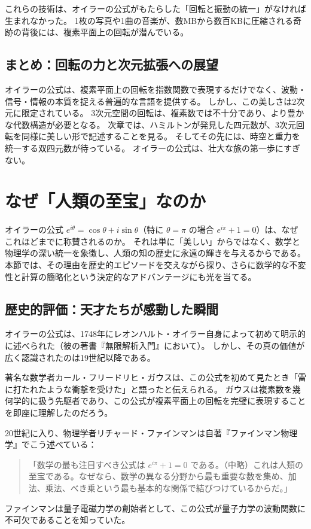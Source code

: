 \documentclass[dvipdfmx,a4paper]{jsbook}
\theoremstyle{definition}
\theoremstyle{remark}
\begin{document}
これらの技術は、オイラーの公式がもたらした「回転と振動の統一」がなければ生まれなかった。
1枚の写真や1曲の音楽が、数MBから数百KBに圧縮される奇跡の背後には、複素平面上の回転が潜んでいる。

\subsection{まとめ：回転の力と次元拡張への展望}

オイラーの公式は、複素平面上の回転を指数関数で表現するだけでなく、波動・信号・情報の本質を捉える普遍的な言語を提供する。
しかし、この美しさは2次元に限定されている。
3次元空間の回転は、複素数では不十分であり、より豊かな代数構造が必要となる。
次章では、ハミルトンが発見した四元数が、3次元回転を同様に美しい形で記述することを見る。
そしてその先には、時空と重力を統一する双四元数が待っている。
オイラーの公式は、壮大な旅の第一歩にすぎない。

\section{なぜ「人類の至宝」なのか}
\label{sec:why-treasure}

オイラーの公式 $e^{i\theta} = \cos\theta + i\sin\theta$（特に $\theta = \pi$ の場合 $e^{i\pi} + 1 = 0$）は、なぜこれほどまでに称賛されるのか。
それは単に「美しい」からではなく、数学と物理学の深い統一を象徴し、人類の知の歴史に永遠の輝きを与えるからである。
本節では、その理由を歴史的エピソードを交えながら探り、さらに数学的な不変性と計算の簡略化という決定的なアドバンテージにも光を当てる。

\subsection{歴史的評価：天才たちが感動した瞬間}

オイラーの公式は、1748年にレオンハルト・オイラー自身によって初めて明示的に述べられた（彼の著書『無限解析入門』において）。
しかし、その真の価値が広く認識されたのは19世紀以降である。

著名な数学者カール・フリードリヒ・ガウスは、この公式を初めて見たとき「雷に打たれたような衝撃を受けた」と語ったと伝えられる。
ガウスは複素数を幾何学的に扱う先駆者であり、この公式が複素平面上の回転を完璧に表現することを即座に理解したのだろう。

20世紀に入り、物理学者リチャード・ファインマンは自著『ファインマン物理学』でこう述べている：
\begin{quote}
  「数学の最も注目すべき公式は $e^{i\pi} + 1 = 0$ である。（中略）これは人類の至宝である。なぜなら、数学の異なる分野から最も重要な数を集め、加法、乗法、べき乗という最も基本的な関係で結びつけているからだ。」
\end{quote}
ファインマンは量子電磁力学の創始者として、この公式が量子力学の波動関数に不可欠であることを知っていた。
\end{document}
